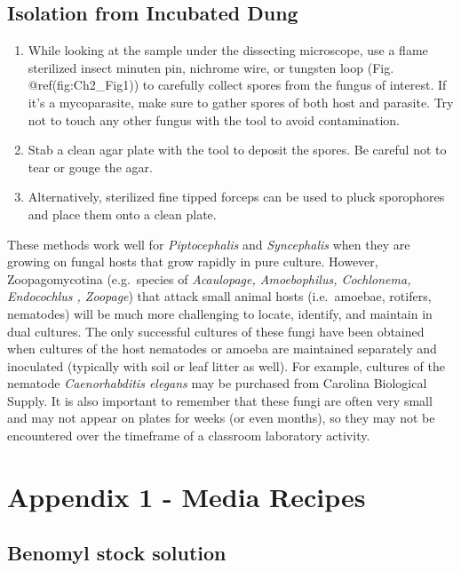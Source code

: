 \documentclass[]{book}
\providecommand{\tightlist}{%
  \setlength{\itemsep}{0pt}\setlength{\parskip}{0pt}}
\begin{document}
\subsection{Isolation from Incubated
Dung}\label{isolation-from-incubated-dung}

\begin{enumerate}
\def\labelenumi{\arabic{enumi}.}
\tightlist
\item
  While looking at the sample under the dissecting microscope, use a
  flame sterilized insect minuten pin, nichrome wire, or tungsten loop
  (Fig. @ref(fig:Ch2\_Fig1)) to carefully collect spores from the fungus
  of interest. If it's a mycoparasite, make sure to gather spores of
  both host and parasite. Try not to touch any other fungus with the
  tool to avoid contamination.
\item
  Stab a clean agar plate with the tool to deposit the spores. Be
  careful not to tear or gouge the agar.
\item
  Alternatively, sterilized fine tipped forceps can be used to pluck
  sporophores and place them onto a clean plate.
\end{enumerate}

These methods work well for \emph{Piptocephalis} and \emph{Syncephalis}
when they are growing on fungal hosts that grow rapidly in pure culture.
However, Zoopagomycotina (e.g.~species of \emph{Acaulopage,
Amoebophilus, Cochlonema, Endocochlus , Zoopage}) that attack small
animal hosts (i.e.~amoebae, rotifers, nematodes) will be much more
challenging to locate, identify, and maintain in dual cultures. The only
successful cultures of these fungi have been obtained when cultures of
the host nematodes or amoeba are maintained separately and inoculated
(typically with soil or leaf litter as well). For example, cultures of
the nematode \emph{Caenorhabditis elegans} may be purchased from
Carolina Biological Supply. It is also important to remember that these
fungi are often very small and may not appear on plates for weeks (or
even months), so they may not be encountered over the timeframe of a
classroom laboratory activity.

\section{Appendix 1 - Media Recipes}\label{appendix-1---media-recipes}

\subsection{Benomyl stock solution}\label{benomyl-stock-solution}
\end{document}
